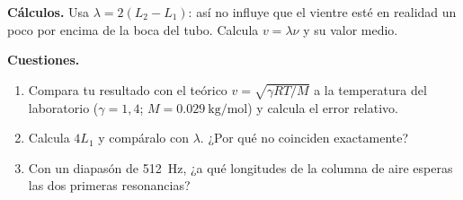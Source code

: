 \textbf{Cálculos.} Usa \(\lambda = 2(L_2 - L_1)\): así no influye que el vientre esté en realidad un poco por encima de la
boca del tubo. Calcula \(v = \lambda\nu\) y su valor medio.

\textbf{Cuestiones.}
\begin{enumerate}[label=\letraminuscula]
    \item Compara tu resultado con el teórico \(v = \sqrt{\gamma R T/M}\) a la temperatura del laboratorio
    (\(\gamma = 1{,}4\); \(M = \qty{0.029}{\kg\per\mol}\)) y calcula el error relativo.
    \item Calcula \(4L_1\) y compáralo con \(\lambda\). ¿Por qué no coinciden exactamente?
    \item Con un diapasón de \qty{512}{\hertz}, ¿a qué longitudes de la columna de aire esperas las dos primeras resonancias?
\end{enumerate}
